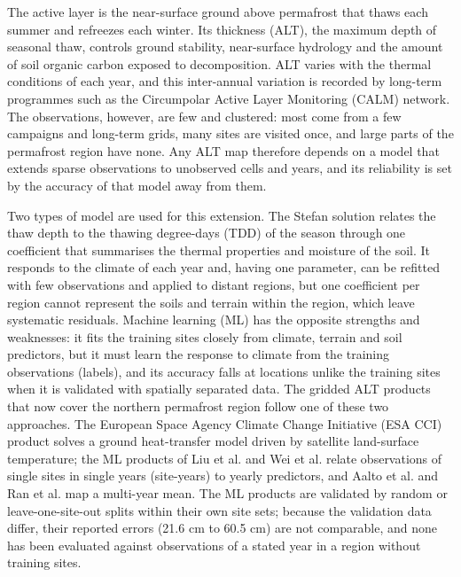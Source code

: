 The active layer is the near-surface ground above permafrost that thaws each summer and refreezes each winter. Its thickness (ALT), the maximum depth of seasonal thaw, controls ground stability, near-surface hydrology and the amount of soil organic carbon exposed to decomposition\cite{Hjort2018,Schuur2015,Biskaborn2019}. ALT varies with the thermal conditions of each year, and this inter-annual variation is recorded by long-term programmes such as the Circumpolar Active Layer Monitoring (CALM) network\cite{Nelson1997,Streletskiy2025}. The observations, however, are few and clustered: most come from a few campaigns and long-term grids, many sites are visited once, and large parts of the permafrost region have none\cite{Moore2025,Veremeeva2025}. Any ALT map therefore depends on a model that extends sparse observations to unobserved cells and years, and its reliability is set by the accuracy of that model away from them.

Two types of model are used for this extension. The Stefan solution relates the thaw depth to the thawing degree-days (TDD) of the season through one coefficient that summarises the thermal properties and moisture of the soil\cite{Stefan1891,Riseborough2008,Nelson1997}. It responds to the climate of each year and, having one parameter, can be refitted with few observations and applied to distant regions, but one coefficient per region cannot represent the soils and terrain within the region, which leave systematic residuals. Machine learning (ML) has the opposite strengths and weaknesses: it fits the training sites closely from climate, terrain and soil predictors, but it must learn the response to climate from the training observations (labels), and its accuracy falls at locations unlike the training sites when it is validated with spatially separated data\cite{Roberts2017,Ploton2020,MeyerPebesma2022,Wadoux2021}. The gridded ALT products that now cover the northern permafrost region follow one of these two approaches. The European Space Agency Climate Change Initiative (ESA CCI) product solves a ground heat-transfer model driven by satellite land-surface temperature\cite{Westermann2024,Westermann2025}; the ML products of Liu et al.\cite{Liu2024} and Wei et al.\cite{Wei2026} relate observations of single sites in single years (site-years) to yearly predictors, and Aalto et al.\cite{Aalto2018} and Ran et al.\cite{Ran2022a} map a multi-year mean. The ML products are validated by random or leave-one-site-out splits within their own site sets; because the validation data differ, their reported errors (21.6 cm\cite{Liu2024} to 60.5 cm\cite{Wei2026}) are not comparable, and none has been evaluated against observations of a stated year in a region without training sites.

